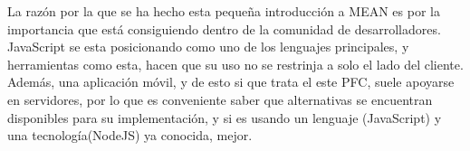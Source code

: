 La razón por la que se ha hecho esta pequeña introducción a \gls{MEAN} es por la importancia que está consiguiendo dentro de la comunidad de desarrolladores. JavaScript se esta posicionando como uno de los lenguajes principales, y herramientas como esta, hacen que su uso no se restrinja a solo el lado del cliente. Además, una aplicación móvil, y de esto si que trata el este \gls{PFC}, suele apoyarse en servidores, por lo que es conveniente saber que alternativas se encuentran disponibles para su implementación, y si es usando un lenguaje (JavaScript) y una tecnología(NodeJS) ya conocida, mejor.

